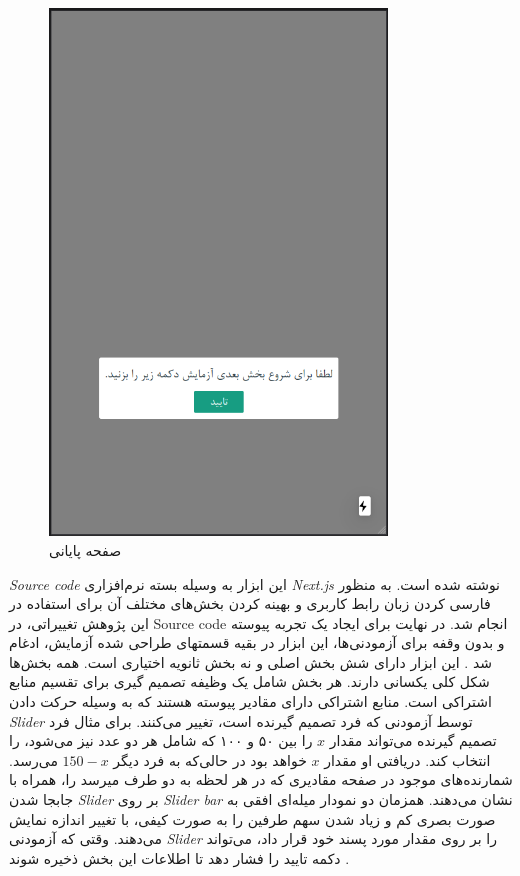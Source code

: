 \begin{figure}[htpb]
    \centering
    \includegraphics[width=0.8\textwidth]{./img/SVOPageFinal.png}
    \caption{صفحه پایانی}
    \label{fig:SVOPageFinal}
\end{figure}

\textit{
    \gls{Source code}
}
این ابزار به وسیله بسته  نرم‌افزاری
\textit{
    \gls{Next.js}
}
نوشته شده است. به منظور فارسی کردن زبان رابط کاربری و
بهینه کردن بخش‌های مختلف آن برای استفاده در این پژوهش  تغییراتی، در
\gls{Source code}
انجام شد.
در نهایت برای ایجاد یک تجربه پیوسته و بدون وقفه برای آزمودنی‌ها، این ابزار
در بقیه قسمتهای طراحی شده آزمایش، ادغام شد
\!.
این ابزار دارای شش بخش  اصلی و نه بخش ثانویه اختیاری است.  همه بخش‌ها شکل کلی
یکسانی دارند. هر بخش شامل یک وظیفه تصمیم گیری برای تقسیم منابع اشتراکی است. منابع
اشتراکی دارای مقادیر پیوسته هستند که به وسیله حرکت دادن
\textit{
    \gls{Slider}
}
توسط آزمودنی که فرد تصمیم گیرنده است، تغییر می‌کنند. برای مثال فرد تصمیم گیرنده
می‌تواند مقدار
$ x $
را بین ۵۰ و ۱۰۰ که شامل هر دو عدد نیز می‌شود، را انتخاب کند. دریافتی او مقدار
$ x $
خواهد بود در حالی‌که به فرد دیگر
$ 150 - x $
می‌رسد. شمارنده‌های موجود در صفحه مقادیری که در هر لحظه به دو طرف میرسد را، همراه با
جابجا شدن
\textit{
    \gls{Slider}
}
بر روی
\textit{
    \gls{Slider bar}
}
نشان می‌دهند. همزمان  دو نمودار میله‌ای افقی به صورت بصری کم و زیاد شدن
سهم طرفین را به صورت کیفی، با تغییر  اندازه نمایش می‌دهند. وقتی که
آزمودنی
\textit{
    \gls{Slider}
}
را بر روی مقدار مورد پسند خود قرار داد، می‌تواند دکمه تایید را فشار دهد تا اطلاعات این بخش ذخیره شوند
\!\citep{darchePdarcheSvoApplication}.


